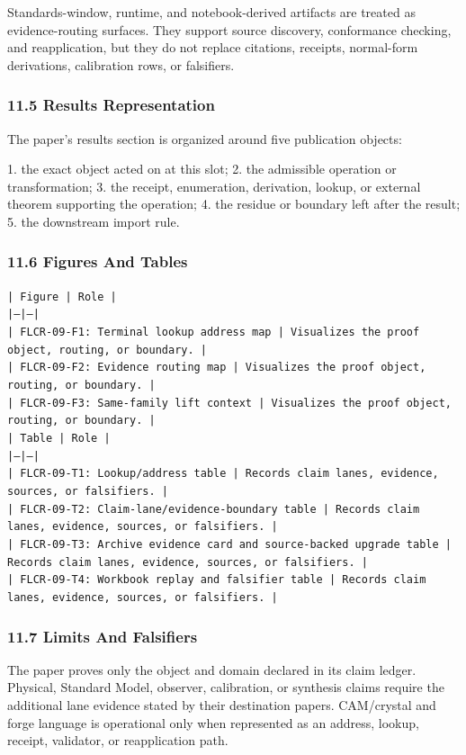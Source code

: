 \documentclass[11pt]{article}
\begin{document}
Standards-window, runtime, and notebook-derived artifacts are treated
as evidence-routing surfaces. They support source discovery, conformance
checking, and reapplication, but they do not replace citations, receipts,
normal-form derivations, calibration rows, or falsifiers.

\subsubsection*{11.5 Results Representation}

The paper's results section is organized around five publication objects:

1. the exact object acted on at this slot;
2. the admissible operation or transformation;
3. the receipt, enumeration, derivation, lookup, or external theorem supporting
   the operation;
4. the residue or boundary left after the result;
5. the downstream import rule.

\subsubsection*{11.6 Figures And Tables}

\noindent\texttt{| Figure | Role |}\\
\noindent\texttt{|---|---|}\\
\noindent\texttt{| FLCR-09-F1: Terminal lookup address map | Visualizes the proof object, routing, or boundary. |}\\
\noindent\texttt{| FLCR-09-F2: Evidence routing map | Visualizes the proof object, routing, or boundary. |}\\
\noindent\texttt{| FLCR-09-F3: Same-family lift context | Visualizes the proof object, routing, or boundary. |}\\

\noindent\texttt{| Table | Role |}\\
\noindent\texttt{|---|---|}\\
\noindent\texttt{| FLCR-09-T1: Lookup/address table | Records claim lanes, evidence, sources, or falsifiers. |}\\
\noindent\texttt{| FLCR-09-T2: Claim-lane/evidence-boundary table | Records claim lanes, evidence, sources, or falsifiers. |}\\
\noindent\texttt{| FLCR-09-T3: Archive evidence card and source-backed upgrade table | Records claim lanes, evidence, sources, or falsifiers. |}\\
\noindent\texttt{| FLCR-09-T4: Workbook replay and falsifier table | Records claim lanes, evidence, sources, or falsifiers. |}\\

\subsubsection*{11.7 Limits And Falsifiers}

The paper proves only the object and domain declared in its claim ledger.
Physical, Standard Model, observer, calibration, or synthesis claims require
the additional lane evidence stated by their destination papers. CAM/crystal
and forge language is operational only when represented as an address, lookup,
receipt, validator, or reapplication path.
\end{document}
